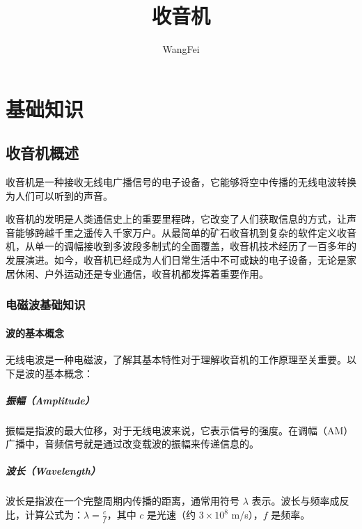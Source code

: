 \documentclass[12pt,UTF8]{ctexbook}
\title{\heiti\zihao{0} 收音机}
\author{WangFei}
\date{}
\begin{document}
\maketitle
\tableofcontents

\frontmatter

\mainmatter

\part{基础知识}

\chapter{收音机概述}

收音机是一种接收无线电广播信号的电子设备，它能够将空中传播的无线电波转换为人们可以听到的声音。

收音机的发明是人类通信史上的重要里程碑，它改变了人们获取信息的方式，让声音能够跨越千里之遥传入千家万户。从最简单的矿石收音机到复杂的软件定义收音机，从单一的调幅接收到多波段多制式的全面覆盖，收音机技术经历了一百多年的发展演进。如今，收音机已经成为人们日常生活中不可或缺的电子设备，无论是家居休闲、户外运动还是专业通信，收音机都发挥着重要作用。

\section{电磁波基础知识}

\subsection{波的基本概念}

无线电波是一种电磁波，了解其基本特性对于理解收音机的工作原理至关重要。以下是波的基本概念：

\subsubsection{振幅（Amplitude）}
振幅是指波的最大位移，对于无线电波来说，它表示信号的强度。在调幅（AM）广播中，音频信号就是通过改变载波的振幅来传递信息的。

\subsubsection{波长（Wavelength）}
波长是指波在一个完整周期内传播的距离，通常用符号 $\lambda$ 表示。波长与频率成反比，计算公式为：$\lambda = \frac{c}{f}$，其中 $c$ 是光速（约 $3 \times 10^8$ m/s），$f$ 是频率。
\end{document}
